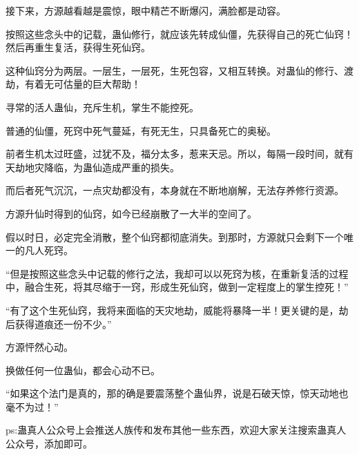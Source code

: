 \begin{this_body}
接下来，方源越看越是震惊，眼中精芒不断爆闪，满脸都是动容。

按照这些念头中的记载，蛊仙修行，就应该先转成仙僵，先获得自己的死亡仙窍！然后再重生复活，获得生死仙窍。

这种仙窍分为两层。一层生，一层死，生死包容，又相互转换。对蛊仙的修行、渡劫，有着无可估量的巨大帮助！

寻常的活人蛊仙，充斥生机，掌生不能控死。

普通的仙僵，死窍中死气蔓延，有死无生，只具备死亡的奥秘。

前者生机太过旺盛，过犹不及，福分太多，惹来天忌。所以，每隔一段时间，就有天劫地灾降临，为蛊仙造成严重的损失。

而后者死气沉沉，一点灾劫都没有，本身就在不断地崩解，无法存养修行资源。

方源升仙时得到的仙窍，如今已经崩散了一大半的空间了。

假以时日，必定完全消散，整个仙窍都彻底消失。到那时，方源就只会剩下一个唯一的凡人死窍。

“但是按照这些念头中记载的修行之法，我却可以以死窍为核，在重新复活的过程中，融合生死，将其尽缩于一窍，形成生死仙窍，做到一定程度上的掌生控死！”

“有了这个生死仙窍，我将来面临的天灾地劫，威能将暴降一半！更关键的是，劫后获得道痕还一份不少。”

方源怦然心动。

换做任何一位蛊仙，都会心动不已。

“如果这个法门是真的，那的确是要震荡整个蛊仙界，说是石破天惊，惊天动地也毫不为过！”

ps:蛊真人公众号上会推送人族传和发布其他一些东西，欢迎大家关注搜索蛊真人公众号，添加即可。

\end{this_body}

